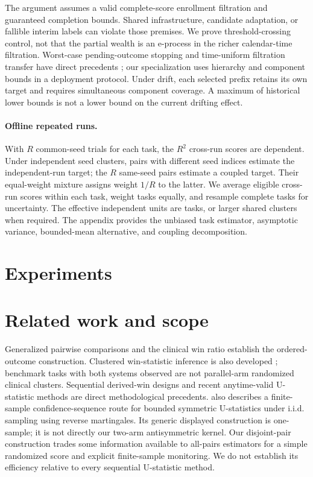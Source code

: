 \documentclass[11pt,letterpaper]{article}
\begin{document}
The argument assumes a valid complete-score enrollment filtration and
guaranteed completion bounds. Shared infrastructure, candidate adaptation,
or fallible interim labels can violate those premises. We prove
threshold-crossing control, not that the partial wealth is an e-process
in the richer calendar-time filtration. Worst-case pending-outcome
stopping and time-uniform filtration transfer have direct precedents
\citep{henzi2022forecast,henzi2022correction,choe2024filtrations}; our
specialization uses hierarchy and component bounds in a deployment
protocol. Under drift, each selected prefix retains its own target and
requires simultaneous component coverage. A maximum of historical lower
bounds is not a lower bound on the current drifting effect.

\paragraph{Offline repeated runs.}
With $R$ common-seed trials for each task, the $R^2$ cross-run scores are
dependent. Under independent seed clusters, pairs with different seed
indices estimate the independent-run target; the $R$ same-seed pairs
estimate a coupled target. Their equal-weight mixture assigns weight
$1/R$ to the latter. We average eligible cross-run scores within each
task, weight tasks equally, and resample complete tasks for uncertainty.
The effective independent units are tasks, or larger shared clusters
when required. The appendix provides the unbiased task estimator,
asymptotic variance, bounded-mean alternative, and coupling decomposition.

\section{Experiments}
\label{sec:experiments}







\section{Related work and scope}
Generalized pairwise comparisons \citep{buyse2010generalized} and the
clinical win ratio \citep{pocock2012win} establish the ordered-outcome
construction. Clustered win-statistic inference is also developed
\citep{fang2026cluster}; benchmark tasks with both systems observed are
not parallel-arm randomized clinical clusters. Sequential derived-win
designs \citep{zhang2024sequential,bergemann2026group} and recent
anytime-valid U-statistic methods \citep{cai2026ustatistics} are direct
methodological precedents. \citet[Section~4.2]{manole2023martingale}
also describes a finite-sample confidence-sequence route for bounded symmetric
U-statistics under i.i.d. sampling using reverse martingales. Its generic
displayed construction is one-sample; it is not directly our two-arm
antisymmetric kernel. Our disjoint-pair construction trades some
information available to all-pairs estimators for a simple randomized
score and explicit finite-sample monitoring. We do not establish its
efficiency relative to every sequential U-statistic method.
\end{document}
